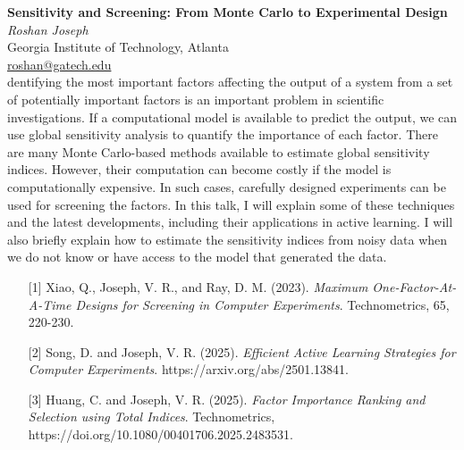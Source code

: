 \documentclass[12pt,a4paper,figuresright]{book}
\newenvironment{talk}[6]%
 {%
  \vskip 0pt\nopagebreak%
 \vskip 0pt\nopagebreak%
  \textbf{#1}\vspace{3mm}\\\nopagebreak%
  \textit{#2}\\\nopagebreak%
  #3\\\nopagebreak%
  \url{#4}\vspace{3mm}\\\nopagebreak%
  \ifthenelse{\equal{#5}{}}{}{Coauthor(s): #5\vspace{3mm}\\\nopagebreak}%
  \ifthenelse{\equal{#6}{}}{}{Special session: #6\quad \vspace{3mm}\\\nopagebreak}%
 }
 {\vspace{1cm}\nopagebreak}%
\begin{document}
	
\begin{talk}
  {Sensitivity and Screening: From Monte Carlo to Experimental Design}%
  {Roshan Joseph}%
  {Georgia Institute of Technology, Atlanta}%
  {roshan@gatech.edu}%
  {}%
			
Identifying the most important factors affecting the output of a system from a set of potentially important factors is an important problem in scientific investigations. If a computational model is available to predict the output, we can use global sensitivity analysis to quantify the importance of each factor. There are many Monte Carlo-based methods available to estimate global sensitivity indices. However, their computation can become costly if the model is computationally expensive. In such cases, carefully designed experiments can be used for screening the factors. In this talk, I will explain some of these techniques and the latest developments, including their applications in active learning. I will also briefly explain how to estimate the sensitivity indices from noisy data when we do not know or have access to the model that generated the data.
\medskip

\begin{enumerate}
	\item[{[1]}] Xiao, Q., Joseph, V. R., and Ray, D. M. (2023). {\it Maximum One-Factor-At-A-Time  Designs for Screening in Computer Experiments}. Technometrics, 65, 220-230.
    \item[{[2]}] Song, D. and Joseph, V. R. (2025). {\it Efficient Active Learning Strategies for Computer Experiments}. https://arxiv.org/abs/2501.13841.
	\item[{[3]}] Huang, C. and Joseph, V. R. (2025). {\it Factor Importance Ranking and Selection using Total Indices}. Technometrics, https://doi.org/10.1080/00401706.2025.2483531.
\end{enumerate}

\end{talk}
\end{document}
